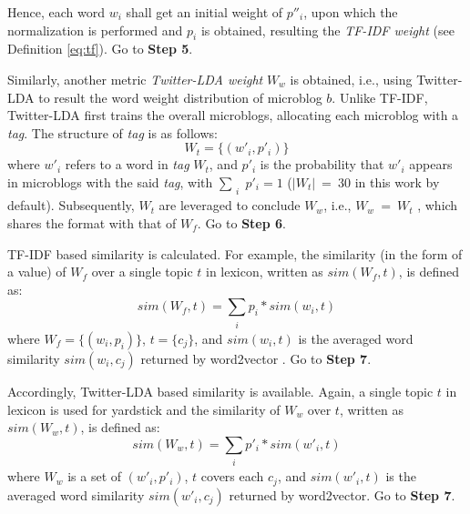 Hence, each word $w_i$ shall get an initial weight of $p''_i$, upon which the normalization is performed and $p_i$ is obtained, resulting the \textit{TF-IDF weight} (see Definition \ref{eq:tf}).
Go to \textbf{Step 5}.

 Similarly, another metric \textit{Twitter-LDA weight} $W_w$ is obtained, i.e., using Twitter-LDA  %
\cite{IEEEexample:zhao2011comparing}
to result the word weight distribution of microblog $b$.
Unlike TF-IDF, Twitter-LDA first trains the overall microblogs, allocating each microblog with a \textit{tag}.
%
The structure of \textit{tag} is as follows:
\begin{equation}
\label{eq:tw-tag}
W_t = \{(w'_i, p'_i)\}
\end{equation}
where $w'_i$ refers to a word in \textit{tag} $W_t$, and $p'_i$ is the probability that $w'_i$ appears in microblogs with the said \textit{tag}, with $\sum_{\substack{i}} p'_i = 1$ ($|W_t|\ =\ 30$ in this work by default).
%
Subsequently, $W_t$ are leveraged to conclude $W_w$, i.e., $W_w\ =\ W_t$ , which shares the format with that of $W_f$.
Go to \textbf{Step 6}.

 TF-IDF based similarity is calculated.
For example, the similarity (in the form of a value) of $W_f$ over a single topic $t$ in lexicon, written as $sim(W_f, t)$, is defined as:
\begin{equation}
\label{eq:sim-tf1}
sim(W_f, t) = \sum_{\substack{i}} p_i*sim(w_i, t)
\end{equation}
where $W_f = \{(w_i, p_i)\}$, $t = \{c_j\}$, and $sim(w_i, t)$ is the averaged word similarity $sim(w_i, c_j)$ returned by word2vector \cite{IEEEexample:mikolov2013distributed}.
Go to \textbf{Step 7}.

\begin{comment}
:
\begin{equation}
\label{eq:sim-tf2}
sim(w_i, t) = \sum_{\substack{j}} sim(w_i, c_j)
\end{equation}
\end{comment}



 Accordingly, Twitter-LDA based similarity is available.
Again, a single topic $t$ in lexicon is used for yardstick and the similarity of $W_w$ over $t$, written as $sim(W_w, t)$, is defined as:
\begin{equation}
\label{eq:sim-tw1}
sim(W_w, t) = \sum_{\substack{i}} p'_i*sim(w'_i, t)
\end{equation}
where $W_w$ is a set of $(w'_i, p'_i)$, $t$ covers each $c_j$,
and $sim(w'_i, t)$ is the averaged word similarity $sim(w'_i, c_j)$ returned by word2vector.
Go to \textbf{Step 7}.

